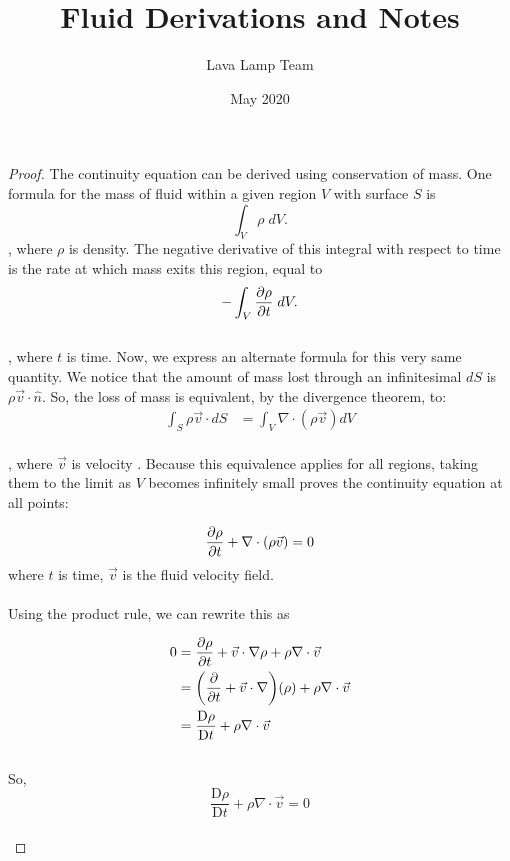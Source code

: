 \documentclass[12 pt]{article}
\theoremstyle{definition}
\newcommand{\Dv}[2]{\frac{\text{D}{#1}}{\text {D}{#2}}}
\begin{document}
\title{Fluid Derivations and Notes}
\author{Lava Lamp Team}
\date{May 2020}
\maketitle
\begin{proof}
The continuity equation can be derived using conservation of mass. One formula for the mass of fluid within a given region $V$ with surface $S$ is \[\int_V \rho \;dV.\] , where $\rho$ is density. The negative derivative of this integral with respect to time is the rate at which mass exits this region, equal to \[-\int_V \pdv{\rho}{t} \;dV.\]
\\
\noindent
, where $t$ is time. Now, we express an alternate formula for this very same quantity. We notice that the amount of mass lost through an infinitesimal $dS$ is $\rho\vec{v}\cdot\hat{n}$. So, the loss of mass is equivalent, by the divergence theorem, to:
\begin{align*}
\int_S \rho\vec{v}\cdot dS &= \int_V \nabla \cdot (\rho\vec{v}) dV
\end{align*}
\\
\noindent
, where $\vec{v}$ is velocity   . Because this equivalence applies for all regions, taking them to the limit as $V$ becomes infinitely small proves the continuity equation at all points:

 \[\pdv{\rho}{t} + \nabla \cdot (\rho \vec{v}) = 0\] where $t$ is time, $\vec{v}$ is the fluid velocity field.
\\\\
\noindent
Using the product rule, we can rewrite this as 

\begin{align*}
0 &= \pdv{\rho}{t} +  \vec{v}\cdot \nabla \rho + \rho\nabla \cdot \vec{v}\\ &= \pqty{\pdv{}{t} + \vec{v} \cdot 
\nabla }(\rho) + \rho\nabla \cdot \vec{v} \\ &= \Dv{\rho}{t} + \rho\nabla\cdot\vec{v}
\end{align*}
\\
\noindent
So, 
\begin{equation}\label{eq:continuitycondition}
\Dv{\rho}{t} + \rho\nabla\cdot \vec{v}= 0
\end{equation}
\\
\noindent
\end{proof}
\end{document}
